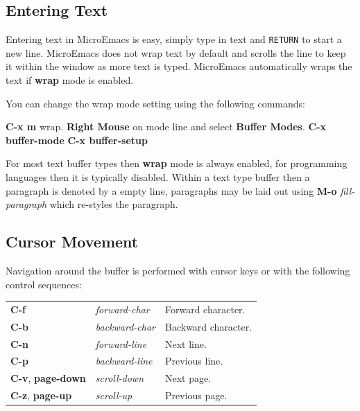 \documentclass[11pt,a4paper,pdftex]{article}
\begin{document}
\subsection{Entering Text}

  Entering text in MicroEmacs is easy, simply type in text and \texttt{RETURN}
  to start a new line. MicroEmacs does not wrap text by default and scrolls
  the line to keep it within the window as more text is typed. MicroEmacs
  automatically wraps the text if \textbf{wrap} mode is enabled.

  You can change the wrap mode setting using the following commands:

  \textbf{C-x m} wrap.\newline
  \textbf{Right Mouse} on mode line and select \textbf{Buffer Modes}.\newline
  \textbf{C-x buffer-mode}\newline
  \textbf{C-x buffer-setup}

  For most text buffer types then \textbf{wrap} mode is always enabled, for
  programming languages then it is typically disabled. Within a text type
  buffer then a paragraph is denoted by a empty line, paragraphs may be laid
  out using \textbf{M-o} \textit{fill-paragraph} which re-styles the
  paragraph.

\subsection{Cursor Movement}

  Navigation around the buffer is performed with cursor keys or with the
  following control sequences:

  \begin{longtable}{ll@{\ --\ }l}
    \endhead
    \endfoot
    \endlastfoot
    \textbf{C-f} & \textit{forward-char} &
    Forward character.\\
    \textbf{C-b} & \textit{backward-char} &
    Backward character.\\
    \textbf{C-n} & \textit{forward-line} &
    Next line.\\
    \textbf{C-p} & \textit{backward-line} &
    Previous line.\\
    \textbf{C-v}, \textbf{page-down} & \textit{scroll-down} &
    Next page.\\
    \textbf{C-z}, \textbf{page-up} & \textit{scroll-up} &
    Previous page.\\
  \end{longtable}
\end{document}
